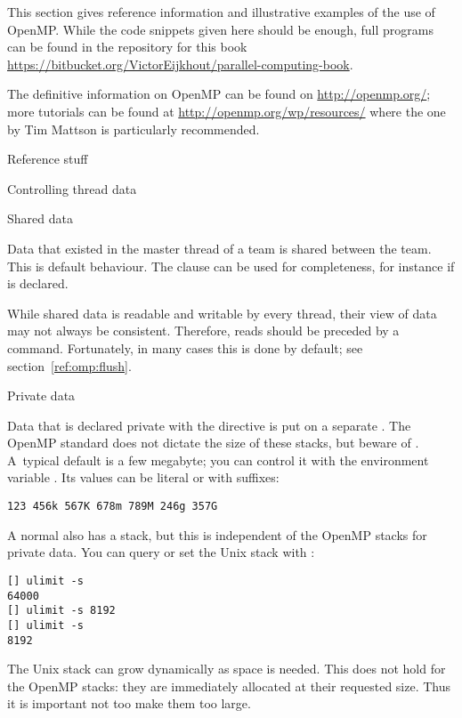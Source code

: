 
This section gives reference information and illustrative examples
of the use of OpenMP. While the code snippets given here should be enough,
full programs can be found in the repository for this book
\url{https://bitbucket.org/VictorEijkhout/parallel-computing-book}.

The definitive information on OpenMP can be found on
\url{http://openmp.org/}; more tutorials can be found at
\url{http://openmp.org/wp/resources/} where the one
by Tim Mattson is particularly recommended.

 {Reference stuff}

 {Controlling thread data}

 {Shared data}

Data that existed in the master thread of a team
is shared between the team. This is default behaviour.
The clause  can be used for completeness,
for instance if  is declared.

While shared data is readable and writable by every thread, their view
of data may not always be consistent. Therefore, reads should be
preceded by a  command.  Fortunately, in many cases
this is done by default; see section~\ref{ref:omp:flush}.

 {Private data}

Data that is declared private with the  directive is
put on a separate . The OpenMP standard
does not dictate the size of these stacks, but beware of .
A~typical default
is a few megabyte; you can control it with the environment variable
. Its values can be literal or with suffixes:
\begin{verbatim}
123 456k 567K 678m 789M 246g 357G
\end{verbatim}

A normal  also has a stack, but this is
independent of the OpenMP stacks for private data. You can query or
set the Unix stack with :
\begin{verbatim}
[] ulimit -s
64000
[] ulimit -s 8192
[] ulimit -s
8192
\end{verbatim}
The Unix stack can grow dynamically as space is needed. This does not
hold for the OpenMP stacks: they are immediately allocated at their
requested size. Thus it is important not too make them too large.

